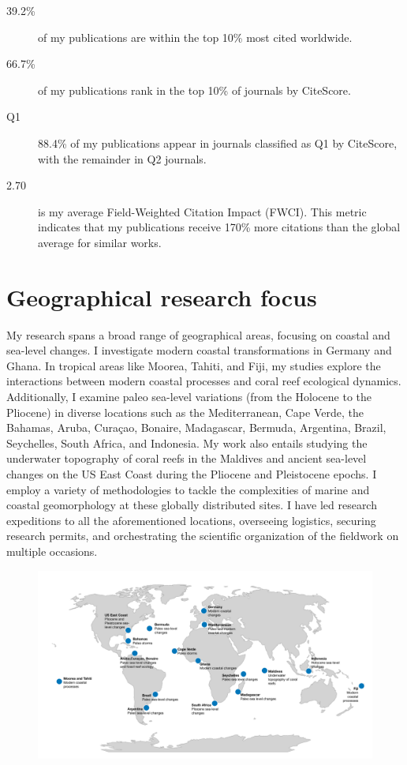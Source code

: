 \documentclass[11pt]{article}
\begin{document}
{\footnotesize 
\begin{description}
  \item [39.2\%] of my publications are within the top 10\% most cited worldwide.
  \item [66.7\%] of my publications rank in the top 10\% of journals by CiteScore.
  \item [Q1] 88.4\% of my publications appear in journals classified as Q1 by CiteScore, with the remainder in Q2 journals.
  \item [2.70] is my average Field-Weighted Citation Impact (FWCI). This metric indicates that my publications receive 170\% more citations than the global average for similar works.
\end{description}}

\section{Geographical research focus}
{\normalfont My research spans a broad range of geographical areas, focusing on coastal and sea-level changes. I investigate modern coastal transformations in Germany and Ghana. In tropical areas like Moorea, Tahiti, and Fiji, my studies explore the interactions between modern coastal processes and coral reef ecological dynamics. Additionally, I examine paleo sea-level variations (from the Holocene to the Pliocene) in diverse locations such as the Mediterranean, Cape Verde, the Bahamas, Aruba, Curaçao, Bonaire, Madagascar, Bermuda, Argentina, Brazil, Seychelles, South Africa, and Indonesia. My work also entails studying the underwater topography of coral reefs in the Maldives and ancient sea-level changes on the US East Coast during the Pliocene and Pleistocene epochs. I employ a variety of methodologies to tackle the complexities of marine and coastal geomorphology at these globally distributed sites. I have led research expeditions to all the aforementioned locations, overseeing logistics, securing research permits, and orchestrating the scientific organization of the fieldwork on multiple occasions.}


\begin{figure}[h]
\centering
\includegraphics[width=\textwidth]{Research_map/field_data.pdf}
\end{figure}
\end{document}
